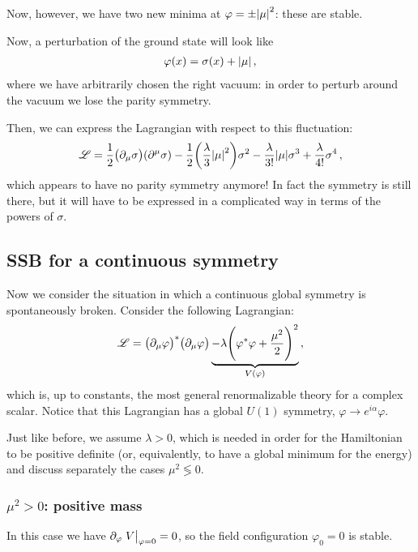\documentclass[main.tex]{subfiles}
\begin{document}
Now, however, we have two new minima at \(\varphi = \pm \abs{\mu }^2\): these are stable.

Now, a perturbation of the ground state will look like 
%
\begin{align}
\varphi (x) = \sigma (x) + \abs{\mu }
\,,
\end{align}
%
where we have arbitrarily chosen the right vacuum: in order to perturb around the vacuum we lose the parity symmetry. 

Then, we can express the Lagrangian with respect to this fluctuation: 
%
\begin{align}
\mathscr{L} = \frac{1}{2} \qty(\partial_{\mu }\sigma ) \qty(\partial^{\mu }\sigma ) - \frac{1}{2} \qty(\frac{\lambda }{3} \abs{\mu }^2)\sigma^2 - \frac{\lambda}{3!} \abs{\mu } \sigma^3 + \frac{\lambda}{4!} \sigma^{4}
\,,
\end{align}
%
which appears to have no parity symmetry anymore! 
In fact the symmetry is still there, but it will have to be expressed in a complicated way in terms of the powers of \(\sigma \). 

\subsection{SSB for a continuous symmetry}

Now we consider the situation in which a continuous global symmetry is spontaneously broken. Consider the following Lagrangian: 
%
\begin{align}
\mathscr{L} = \qty(\partial_{\mu }\varphi )^{*} \qty(\partial_{\mu } \varphi ) \underbrace{- \lambda \qty(\varphi^{*} \varphi + \frac{\mu^2}{2})^2}_{V(\varphi )}
\,,
\end{align}
%
which is, up to constants, the most general renormalizable theory for a complex scalar.
Notice that this Lagrangian has a global \(U(1)\) symmetry, \(\varphi \to e^{i \alpha } \varphi \). 

Just like before, we assume \(\lambda > 0\), which is needed in order for the Hamiltonian to be positive definite (or, equivalently, to have a global minimum for the energy) and discuss separately the cases \(\mu^2 \lessgtr 0\). 

\subsubsection{\(\mu^2 > 0\): positive mass}

In this case we have \(\partial_{\varphi } \eval{V}_{\varphi =0} = 0\), so the field configuration \(\varphi_0 = 0 \) is stable. 
\end{document}
